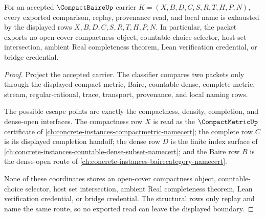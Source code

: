 \begin{theorem}
\label{thm:compact-baire-nonescape-boundary}
For an accepted $\CompactBaireUp$ carrier $K=(X,B,D,C,S,R,T,H,P,N)$, every exported comparison, replay, provenance read, and local name is exhausted by the displayed rows $X,B,D,C,S,R,T,H,P,N$. In particular, the packet exports no open-cover compactness object, countable-choice selector, host set intersection, ambient Real completeness theorem, Lean verification credential, or bridge credential.
\end{theorem}
\begin{proof}
Project the accepted carrier. The classifier compares two packets only through the displayed compact metric, Baire, countable dense, complete-metric, stream, regular-rational, trace, transport, provenance, and local naming rows.

The possible escape points are exactly the compactness, density, completion, and dense-open interfaces. The compactness row $X$ is read as the $\CompactMetricUp$ certificate of \autoref{ch:concrete-instances-compactmetric-namecert}; the complete row $C$ is its displayed completion handoff; the dense row $D$ is the finite index surface of \autoref{ch:concrete-instances-countable-dense-subset-namecert}; and the Baire row $B$ is the dense-open route of \autoref{ch:concrete-instances-bairecategory-namecert}.

None of these coordinates stores an open-cover compactness object, countable-choice selector, host set intersection, ambient Real completeness theorem, Lean verification credential, or bridge credential. The structural rows only replay and name the same route, so no exported read can leave the displayed boundary.
\end{proof}


\begin{closurestatus}{\CompactBaireUp}
  \theoryclosure{\seedClosure}
  \formalstatus{\unformalizedV}
\end{closurestatus}
